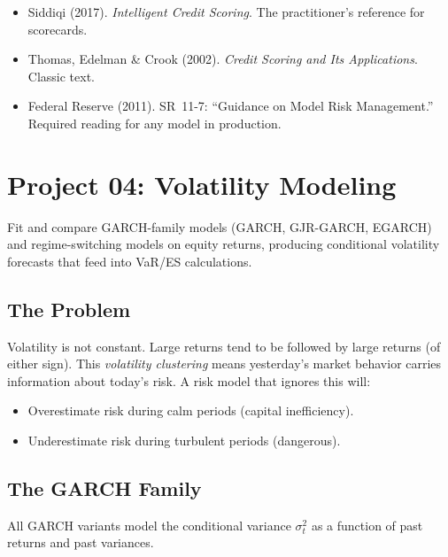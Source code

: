 \documentclass[11pt, a4paper]{article}
\begin{document}
\begin{refbox}
\begin{itemize}
    \item Siddiqi (2017). \emph{Intelligent Credit Scoring}. The practitioner's reference for scorecards.
    \item Thomas, Edelman \& Crook (2002). \emph{Credit Scoring and Its Applications}. Classic text.
    \item Federal Reserve (2011). SR~11-7: ``Guidance on Model Risk Management.'' Required reading for any model in production.
\end{itemize}
\end{refbox}

\section{Project 04: Volatility Modeling}

\begin{objective}
Fit and compare GARCH-family models (GARCH, GJR-GARCH, EGARCH) and regime-switching models on equity returns, producing conditional volatility forecasts that feed into VaR/ES calculations.
\end{objective}

\subsection{The Problem}

Volatility is not constant.
Large returns tend to be followed by large returns (of either sign).
This \emph{volatility clustering} means yesterday's market behavior carries information about today's risk.
A risk model that ignores this will:
\begin{itemize}
    \item Overestimate risk during calm periods (capital inefficiency).
    \item Underestimate risk during turbulent periods (dangerous).
\end{itemize}

\subsection{The GARCH Family}

All GARCH variants model the conditional variance $\sigma_t^2$ as a function of past returns and past variances.
\end{document}
